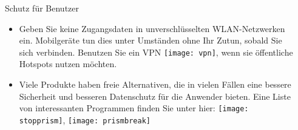 \documentclass[final]{beamer}
\newlength{\sepwid}
\newlength{\twocolwid}
\begin{document}
\begin{frame}[t]
\begin{columns}[t]
\begin{column}{\twocolwid}
\begin{alertblock}{Schutz für Benutzer}
{\begin{itemize}
 \item Geben Sie keine Zugangsdaten in unverschlüsselten WLAN-Netzwerken ein. Mobilgeräte tun
 dies unter Umständen ohne Ihr Zutun, sobald Sie sich verbinden. Benutzen Sie ein VPN 
 \texttt{[image: vpn]}, wenn sie öffentliche Hotspots nutzen möchten.
 
 \item Viele Produkte haben freie Alternativen, die in vielen Fällen eine bessere Sicherheit
 und besseren Datenschutz für die Anwender bieten. Eine Liste von interessanten Programmen finden
 Sie unter hier: \texttt{[image: stopprism]}, \texttt{[image: prismbreak]}
\end{itemize}
}
\end{alertblock}

\end{column} %

\begin{column}{\sepwid}\end{column} %

\end{columns} %

\end{frame} %
\end{document}
